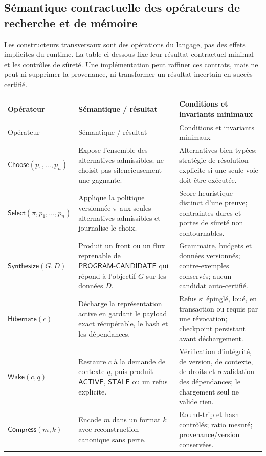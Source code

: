 \documentclass[11pt,a4paper]{article}
\theoremstyle{definition}
\theoremstyle{plain}
\theoremstyle{remark}
\begin{document}
\subsection{Sémantique contractuelle des opérateurs de recherche et de mémoire}
Les constructeurs transversaux sont des opérations du langage, pas des effets implicites du runtime. La table ci-dessous fixe leur résultat contractuel minimal et les contrôles de sûreté. Une implémentation peut raffiner ces contrats, mais ne peut ni supprimer la provenance, ni transformer un résultat incertain en succès certifié.
\begin{longtable}{p{}p{}p{}}
\toprule Opérateur & Sémantique / résultat & Conditions et invariants minimaux \\
\midrule
\endfirsthead
\toprule Opérateur & Sémantique / résultat & Conditions et invariants minimaux \\
\midrule
\endhead
\(\mathsf{Choose}(p_1,\ldots,p_n)\) & Expose l'ensemble des alternatives admissibles; ne choisit pas silencieusement une gagnante. & Alternatives bien typées; stratégie de résolution explicite si une seule voie doit être exécutée. \\
\(\mathsf{Select}(\pi,p_1,\ldots,p_n)\) & Applique la politique versionnée \(\pi\) aux seules alternatives admissibles et journalise le choix. & Score heuristique distinct d'une preuve; contraintes dures et portes de sûreté non contournables. \\
\(\mathsf{Synthesize}(G,D)\) & Produit un front ou un flux reprenable de \(\mathsf{PROGRAM\mbox{-}CANDIDATE}\) qui répond à l'objectif \(G\) sur les données \(D\). & Grammaire, budgets et données versionnés; contre-exemples conservés; aucun candidat auto-certifié. \\
\(\mathsf{Hibernate}(c)\) & Décharge la représentation active en gardant le payload exact récupérable, le hash et les dépendances. & Refus si épinglé, loué, en transaction ou requis par une révocation; checkpoint persistant avant déchargement. \\
\(\mathsf{Wake}(c,q)\) & Restaure \(c\) à la demande de contexte \(q\), puis produit \(\mathsf{ACTIVE}\), \(\mathsf{STALE}\) ou un refus explicite. & Vérification d'intégrité, de version, de contexte, de droits et revalidation des dépendances; le chargement seul ne valide rien. \\
\(\mathsf{Compress}(m,k)\) & Encode \(m\) dans un format \(k\) avec reconstruction canonique sans perte. & Round-trip et hash contrôlés; ratio mesuré; provenance/version conservées. \\

\end{longtable}
\end{document}
